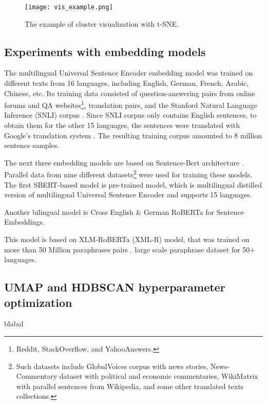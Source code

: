 \documentclass[fontsize=12pt,a4paper,twoside,openany]{scrbook}
\begin{document}
\begin{figure}[h]
\centering
\texttt{[image: vis\_example.png]}
\caption{The example of cluster visualization with t-SNE.}
\label{fig:cluster_vis}
\end{figure}


\subsection{Experiments with embedding models}
\label{sec:exp_emb}


The multilingual Universal Sentence Encoder embedding model was trained on different texts from 16 languages, including English, German, French, Arabic, Chinese, etc. Its training data consisted of question-answering pairs from online forums and QA websites\footnote{Reddit, StackOverflow, and YahooAnswers.}, translation pairs, and the Stanford Natural Language Inference (SNLI) corpus \parencite{Cer18c}. Since SNLI corpus only contains English sentences, to obtain them for the other 15 languages, the sentences were translated with Google's translation system \parencite{Cer18c}. The resulting training corpus amounted to 8 million sentence samples.

The next three embedding models are based on Sentence-Bert architecture \parencite{Reimers19}. Parallel data from nine different datasets\footnote{Such datasets include GlobalVoices corpus with news stories, News-Commentary dataset with political and economic commentaries, WikiMatrix with parallel sentences from Wikipedia, and some other translated texts collections.} were used for training these models. The first SBERT-based model is  pre-trained model, which is multilingual distilled version of multilingual Universal Sentence Encoder and supports 15 languages. 


Another bilingual model is Cross English \& German RoBERTa for Sentence Embeddings.


This model is based on XLM-RoBERTa (XML-R) model, that was trained on more than 50 Million paraphrases pairs \parencite{Reimers20}.
 large scale paraphrase dataset for 50+ languages. 







\subsection{UMAP and HDBSCAN hyperparameter optimization}
\label{sec:hypeparam}
blabal
\end{document}
